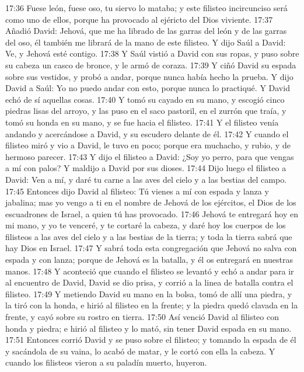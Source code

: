 17:36 Fuese león, fuese oso, tu siervo lo mataba; y este filisteo incircunciso será como uno de ellos, porque ha provocado al ejéricto del Dios viviente.  
17:37 Añadió David: Jehová, que me ha librado de las garras del león y de las garras del oso, él también me librará de la mano de este filisteo. Y dijo Saúl a David: Ve, y Jehová esté contigo.  
17:38 Y Saúl vistió a David con sus ropas, y puso sobre su cabeza un casco de bronce, y le armó de coraza.  
17:39 Y ciñó David su espada sobre sus vestidos, y probó a andar, porque nunca había hecho la prueba. Y dijo David a Saúl: Yo no puedo andar con esto, porque nunca lo practiqué. Y David echó de sí aquellas cosas.  
17:40 Y tomó su cayado en su mano, y escogió cinco piedras lisas del arroyo, y las puso en el saco pastoril, en el zurrón que traía, y tomó su honda en su mano, y se fue hacia el filisteo.  
17:41 Y el filisteo venía andando y acercándose a David, y su escudero delante de él.  
17:42 Y cuando el filisteo miró y vio a David, le tuvo en poco; porque era muchacho, y rubio, y de hermoso parecer.  
17:43 Y dijo el filisteo a David: ¿Soy yo perro, para que vengas a mí con palos? Y maldijo a David por sus dioses.  
17:44 Dijo luego el filisteo a David: Ven a mí, y daré tu carne a las aves del cielo y a las bestias del campo.  
17:45 Entonces dijo David al filisteo: Tú vienes a mí con espada y lanza y jabalina; mas yo vengo a ti en el nombre de Jehová de los ejércitos, el Dios de los escuadrones de Israel, a quien tú has provocado.  
17:46 Jehová te entregará hoy en mi mano, y yo te venceré, y te cortaré la cabeza, y daré hoy los cuerpos de los filisteos a las aves del cielo y a las bestias de la tierra; y toda la tierra sabrá que hay Dios en Israel.  
17:47 Y sabrá toda esta congregación que Jehová no salva con espada y con lanza; porque de Jehová es la batalla, y él os entregará en nuestras manos.  
17:48 Y aconteció que cuando el filisteo se levantó y echó a andar para ir al encuentro de David, David se dio prisa, y corrió a la linea de batalla contra el filisteo.  
17:49 Y metiendo David su mano en la bolsa, tomó de allí una piedra, y la tiró con la honda, e hirió al filisteo en la frente; y la piedra quedó clavada en la frente, y cayó sobre su rostro en tierra.  
17:50 Así venció David al filisteo con honda y piedra; e hirió al filisteo y lo mató, sin tener David espada en su mano.  
17:51 Entonces corrió David y se puso sobre el filisteo; y tomando la espada de él y sacándola de su vaina, lo acabó de matar, y le cortó con ella la cabeza. Y cuando los filisteos vieron a su paladín muerto, huyeron.  
